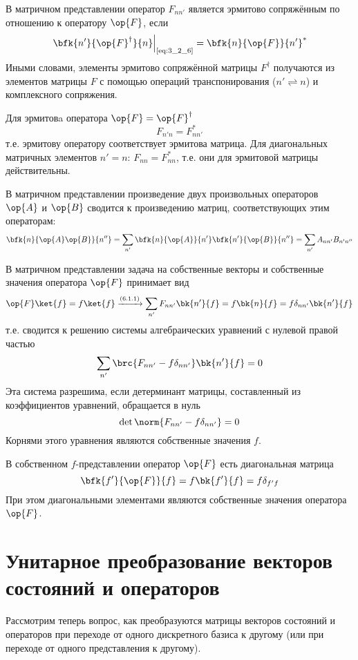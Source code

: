 В матричном представлении оператор $F_{nn'}$ является эрмитово сопряжённым по отношению к оператору $\op{F}$, если
$$
\left .\bfk{n'}{\op{F}^\dag}{n}\right|_{\text{\eqref{eq:3_2_6}}} = \bfk{n}{\op{F}}{n'}^*
$$%
%
Иными словами, элементы эрмитово сопряжённой матрицы $F^\dag$ получаются из элементов матрицы $F$ с помощью операций транспонирования ($n' \rightleftharpoons n $) и комплексного сопряжения.

Для эрмитовa оператора $\op{F} = \op{F}^\dag$
$$
F_{n'n}=F_{nn'}^*
$$%
%
т.е. эрмитову оператору соответствует эрмитова матрица. Для диагональных матричных элементов $n' = n$: $F_{nn} = F^*_{nn}$, т.е. они для эрмитовой матрицы действительны.

В матричном представлении произведение двух произвольных операторов $\op{A}$ и $\op{B}$ сводится к произведению матриц, соответствующих этим операторам:%
$$
\bfk{n}{\op{A}\op{B}}{n''} =
	\sum_{n'} \bfk{n}{\op{A}}{n'} \bfk{n'}{\op{B}}{n''} =
	\sum_{n'} A_{nn'} B_{n'n''}
$$

В матричном представлении задача на собственные векторы и собственные значения оператора $\op{F}$ принимает вид%
$$
\op{F}\ket{f}=f\ket{f} \xrightarrow{(6.1.1)} \sum_{n'} F_{nn'} \bk{n'}{f} = f\bk{n}{f}=f\delta_{nn'}\bk{n'}{f}
$$%
%
т.е. сводится к решению системы алгебраических уравнений с нулевой правой частью%
%
$$
\sum_{n'}\brc{F_{nn'}-f\delta_{nn'}}\bk{n'}{f}=0
$$%
%
Эта система разрешима, если детерминант матрицы, составленный из коэффициентов уравнений, обращается в нуль%
%
$$
\det{\norm{F_{nn'}-f\delta_{nn'}}}=0
$$%
%
Корнями этого уравнения являются собственные значения $f$.

В собственном $f$-представлении оператор $\op{F}$ есть диагональная матрица%
%
$$
\bfk{f'}{\op{F}}{f}=f\bk{f'}{f}=f\delta_{f'f}
$$%
%
При этом диагональными элементами являются собственные значения оператора $\op{F}$.


\section{Унитарное преобразование векторов состояний и операторов}

Рассмотрим теперь вопрос, как преобразуются матрицы векторов состояний и операторов при переходе от одного дискретного базиса к другому (или при переходе от одного представления к другому).

